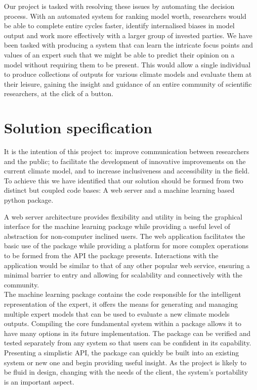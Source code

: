 \documentclass{ecmm427_assignment}
\begin{document}
\quad Our project is tasked with resolving these issues by automating the decision process. With an automated system for ranking model worth, researchers would be able to complete entire cycles faster, identify internalised biases in model output and work more effectively with a larger group of invested parties. We have been tasked with producing a system that can learn the intricate focus points and values of an expert such that we might be able to predict their opinion on a model without requiring them to be present. This would allow a single individual to produce collections of outputs for various climate models and evaluate them at their leisure, gaining the insight and guidance of an entire community of scientific researchers, at the click of a button.

\section{Solution specification}

\quad It is the intention of this project to: improve communication between researchers and the public; to facilitate the development of innovative improvements on the current climate model, and to increase inclusiveness and accessibility in the field. To achieve this we have identified that our solution should be formed from two distinct but coupled code bases: A web server and a machine learning based python package.

\quad A web server architecture provides flexibility and utility in being the graphical interface for the machine learning package while providing a useful level of abstraction for non-computer inclined users. The web application facilitates the basic use of the package while providing a platform for more complex operations to be formed from the API the package presents. Interactions with the application would be similar to that of any other popular web service, ensuring a minimal barrier to entry and allowing for scalability and connectively with the community.\\

\quad The machine learning package contains the code responsible for the intelligent representation of the expert, it offers the means for generating and managing multiple expert models that can be used to evaluate a new climate models outputs. Compiling the core fundamental system within a package allows it to have many options in its future implementation. The package can be verified and tested separately from any system so that users can be confident in its capability. Presenting a simplistic API, the package can quickly be built into an existing system or new one and begin providing useful insight. As the project is likely to be fluid in design, changing with the needs of the client, the system's portability is an important aspect.\\
\end{document}
